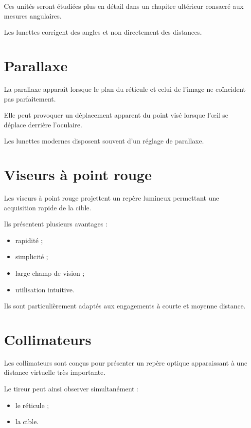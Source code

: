 Ces unités seront étudiées plus en détail dans un chapitre ultérieur consacré
aux mesures angulaires.

\begin{aretenir}

Les lunettes corrigent des angles et non directement des distances.

\end{aretenir}

\section{Parallaxe}

La parallaxe apparaît lorsque le plan du réticule et celui de l'image ne
coïncident pas parfaitement.

Elle peut provoquer un déplacement apparent du point visé lorsque l'œil se
déplace derrière l'oculaire.

Les lunettes modernes disposent souvent d'un réglage de parallaxe.

\section{Viseurs à point rouge}

Les viseurs à point rouge projettent un repère lumineux permettant une
acquisition rapide de la cible.

Ils présentent plusieurs avantages :

\begin{itemize}
    \item rapidité ;
    \item simplicité ;
    \item large champ de vision ;
    \item utilisation intuitive.
\end{itemize}

Ils sont particulièrement adaptés aux engagements à courte et moyenne
distance.

\section{Collimateurs}

Les collimateurs sont conçus pour présenter un repère optique apparaissant à
une distance virtuelle très importante.

Le tireur peut ainsi observer simultanément :

\begin{itemize}
    \item le réticule ;
    \item la cible.
\end{itemize}

